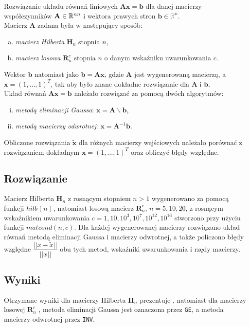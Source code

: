 \documentclass[11pt]{mk-polish-lab-report}
\let\times\relax%
\DeclareMathOperator{\times}{\cdot}
\begin{document}
Rozwiązanie układu równań liniowych $\mathbf{Ax} = \mathbf{b}$ dla danej macierzy współczynników $\mathbf{A} \in \mathbb{R}^{n\times n}$ i wektora prawych stron $\mathbf{b} \in \mathbb{R}^n$. \\
Macierz $\mathbf{A}$ zadana była w następujący sposób:
\begin{enumerate}[(a)]
\item \emph{macierz Hilberta} $\mathbf{H}_n$ stopnia $n$,
\item \emph{macierz losowa} $\mathbf{R}_n^c$ stopnia $n$ o danym wskaźniku uwarunkowania $c$.
\end{enumerate}
Wektor $\mathbf{b}$ natomiast jako $\mathbf{b} = \mathbf{Ax}$, gdzie $\mathbf{A}$ jest wygenerowaną macierzą, a $\mathbf{x} = (1, \dots, 1)^{T}$, tak aby było znane dokładne rozwiązanie dla $\mathbf{A}$ i $\mathbf{b}$. \\
Układ równań $\mathbf{Ax} = \mathbf{b}$ należało rozwiązać za pomocą dwóch algorytmów:
\begin{enumerate}[(i)]
\item \emph{metodą eliminacji Gaussa}: $\mathbf{x} = \mathbf{A} \backslash \mathbf{b}$,
\item \emph{metodą macierzy odwrotnej}: $\mathbf{x} = \mathbf{A}^{-1}\mathbf{b}$.
\end{enumerate}
Obliczone rozwiązania $\mathbf{\tilde{x}}$ dla różnych macierzy wejściowych należało porównać z rozwiązaniem dokładnym $\mathbf{x} = (1, \dots, 1)^{T}$ oraz obliczyć błędy względne. 


\subsection{Rozwiązanie}

Macierz Hilberta $\mathbf{H}_n$ z rosnącym stopniem $n > 1$ wygenerowano za pomocą funkcji $hilb(n)$, natomiast losową macierz $\mathbf{R}_n^c$, $n = 5,10,20$, z rosnącym wskaźnikiem uwarunkowania $c=1,10,10^3,10^7,10^{12},10^{16}$ stworzono przy użyciu funkcji $matcond(n, c)$. Dla każdej wygenerowanej macierzy rozwiązano układ równań metodą eliminacji Gaussa i macierzy odwrotnej, a także policzono błędy względne $\dfrac{||x - \tilde{x}||}{||x||}$ obu tych metod, wskaźniki uwarunkowania i rzędy macierzy.

\subsection{Wyniki}
Otrzymane wyniki dla macierzy Hilberta $\mathbf{H}_n$ prezentuje , natomiast dla macierzy losowej $\mathbf{R}_n^c$ , metoda eliminacji Gaussa jest oznaczona przez \texttt{GE}, a metoda macierzy odwrotnej przez \texttt{INV}.
\end{document}
